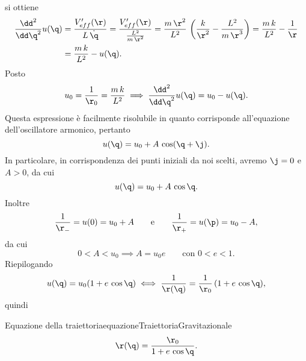 si ottiene
\[
	\begin{split}
		\frac{\dd^2}{\dd\q^2}u(\q) & = \frac{V_{eff}'(\r)}{L\,\dot{\q}} = \frac{V_{eff}'(\r)}{\frac{L^2}{m\,\r^2}} = \frac{m\,\r^2}{L^2}\,\left( \frac{k}{\r^2}-\frac{L^2}{m\,\r^3} \right) = \frac{m\,k}{L^2}-\frac{1}{\r}\\
		& = \frac{m\,k}{L^2}-u(\q).
	\end{split}
\]
Posto 
\[
	u_0 = \frac{1}{\r_0} = \frac{m\,k}{L^2} \implies \frac{\dd^2}{\dd\q^2}u(\q) = u_0-u(\q).
\]
%
%
Questa espressione è facilmente risolubile in quanto corrisponde all'equazione dell'oscillatore armonico, pertanto
\[
	u(\q) = u_0+A\,\cos(\q+\j).
\]
In particolare, in corrispondenza dei punti iniziali da noi scelti, avremo \(\j=0\) e \(A>0\), da cui
\[
	u(\q) = u_0+A\,\cos\q.
\]
Inoltre
\[
	\frac{1}{\r_-} = u(0) = u_0+A \qquad\text{e}\qquad \frac{1}{\r_+} = u(\p) = u_0-A,
\]
da cui
\[
	0 < A < u_0 \implies A = u_0 e \qquad\text{con } 0 < e < 1.
\]
Riepilogando
\[
	u(\q) = u_0(1+e\,\cos\q) \iff \frac{1}{\r(\q)} = \frac{1}{\r_0}\,(1+e\,\cos\q),
\]
quindi

\begin{remark}{Equazione della traiettoria}{equazioneTraiettoriaGravitazionale}
	\[
		\r(\q) = \frac{\r_0}{1+e\,\cos\q}.
	\]
\end{remark}

